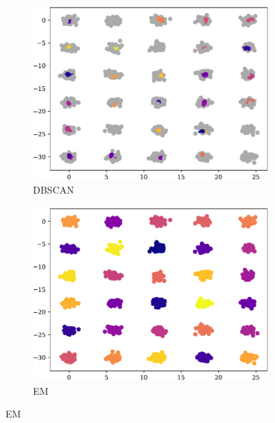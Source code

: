 \begin{figure}[t!]
    \begin{subfigure}[b]{0.45\textwidth}
        \includegraphics[width=\textwidth]{../plots/30-30-6_pred_dbscan.pdf}
        \caption{DBSCAN}
        \label{subfig:30-30-6-dbscan}
    \end{subfigure}
    \hspace{0.09\textwidth}
    \begin{subfigure}[b]{0.45\textwidth}
        \includegraphics[width=\textwidth]{../plots/30-30-6_pred_em.pdf}
        \caption{EM}
        \label{subfig:30-30-6-em}
    \end{subfigure}
\end{figure}
